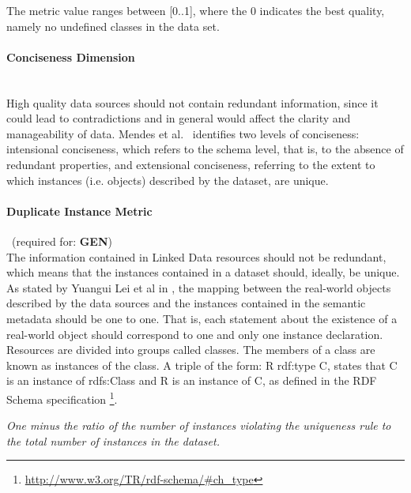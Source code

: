 The metric value ranges between [0..1], where  the 0 indicates the best quality, namely no undefined classes in the data set.

\paragraph{Conciseness Dimension}~\\ %
High quality data sources should not contain redundant information, since it could lead to contradictions and in general would affect the clarity and manageability of data. Mendes et al.~\cite{Mendes2012} identifies two levels of conciseness: intensional conciseness, which refers to the schema level, that is, to the absence of redundant properties, and extensional conciseness, referring to the extent to which instances (i.e. objects) described by the dataset, are unique.

\paragraph{Duplicate Instance Metric}~(required for: \textbf{GEN})~\\
The information contained in Linked Data resources should not be redundant, which means that the instances contained in a dataset should, ideally, be unique. As stated by Yuangui Lei et al in \cite{Lei2007}, the mapping between the real-world objects described by the data sources and the instances contained in the semantic metadata should be one to one. That is, each statement about the existence of a real-world object should correspond to one and only one instance declaration.
Resources are divided into groups called classes. The members of a class are known as instances of the class. A triple of the form: R rdf:type C, states that C is an instance of rdfs:Class and R is an instance of C, as defined in the RDF Schema specification \footnote{\url{http://www.w3.org/TR/rdf-schema/#ch_type}}.

\begin{mdframed}[style=metricdefinition]
\emph{One minus the ratio of the number of instances violating the uniqueness rule to the total number of instances in the dataset.}
\end{mdframed}

